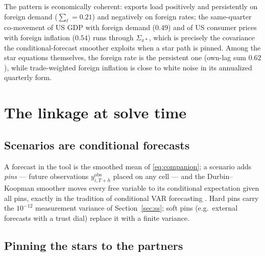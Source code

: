 \documentclass[11pt]{article}
\begin{document}
The pattern is economically coherent: exports load positively and persistently on foreign demand
($\sum_\ell = 0.21$) and negatively on foreign rates; the same-quarter co-movement of US GDP with
foreign demand ($0.49$) and of US consumer prices with foreign inflation ($0.54$) runs through
$\Sigma_{x*}$, which is precisely the covariance the conditional-forecast smoother exploits when
a star path is pinned. Among the star equations themselves, the foreign rate is the persistent
one (own-lag sum $0.62$), while trade-weighted foreign inflation is close to white noise in its
annualized quarterly form.

\section{The linkage at solve time}\label{sec:solve}

\subsection{Scenarios are conditional forecasts}

A forecast in the tool is the smoothed mean of \eqref{eq:companion}; a scenario adds \emph{pins}
--- future observations $y^{\mathrm{obs}}_{i,T+h}$ placed on any cell --- and the Durbin--Koopman
smoother moves every free variable to its conditional expectation given all pins, exactly in the
tradition of conditional VAR forecasting \citep{WaggonerZha1999,BanburaGiannoneLenza2015}. Hard
pins carry the $10^{-12}$ measurement variance of Section~\ref{sec:ss}; soft pins (e.g.\ external
forecasts with a trust dial) replace it with a finite variance.

\subsection{Pinning the stars to the partners}
\end{document}
